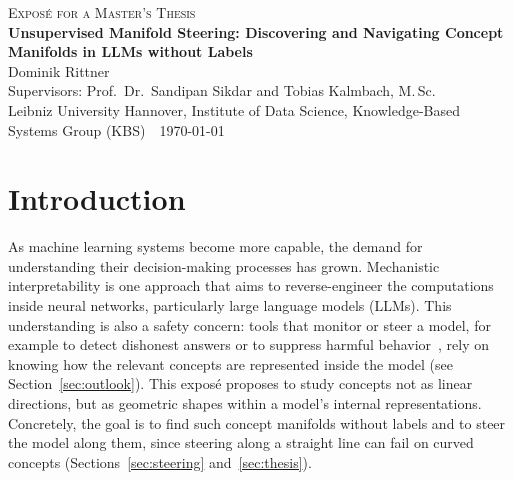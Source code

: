 \documentclass[11pt,a4paper]{article}
\newif\ifdraft
\newcommand{\fromextra}[1]{\textcolor{blue}{#1}}
\newcommand{\fromnotes}[1]{\textcolor{green!50!black}{#1}}
\newcommand{\fromold}[1]{\textcolor{violet}{#1}}
\newcommand{\fromclaude}[1]{\textcolor{orange!85!black}{#1}}
\newcommand{\fromextra}[1]{#1}
\newcommand{\fromnotes}[1]{#1}
\newcommand{\fromold}[1]{#1}
\newcommand{\fromclaude}[1]{#1}
\newcommand{\thesistitle}{Unsupervised Manifold Steering: Discovering and Navigating Concept Manifolds in LLMs without Labels}
\newcommand{\authorname}{Dominik Rittner}
\newcommand{\supervisor}{Prof.\ Dr.\ Sandipan Sikdar and Tobias Kalmbach, M.\,Sc.}
\newcommand{\university}{Leibniz University Hannover, Institute of Data Science, Knowledge-Based Systems Group (KBS)}
\begin{document}
\begin{center}
  {\small\scshape Exposé for a Master's Thesis}\\[0.4ex]
  {\Large\bfseries \thesistitle}\\[0.8ex]
  \authorname\\
  Supervisors: \supervisor\\
  \university\ \textbullet\ \today
\end{center}

\ifdraft
{\small\noindent\textit{Draft legend:} black = Structure.md reading notes;
\fromextra{blue = from the papers, not in the notes};
\fromnotes{green = other notes in the vault};
\fromold{purple = moved from old\_expose.tex};
\fromclaude{orange = added by Claude after your approval}.\par}
\fi




\section{Introduction}
As machine learning systems become more capable, the demand for understanding their decision-making processes has grown. Mechanistic interpretability is one approach that aims to reverse-engineer the computations inside neural networks, particularly large language models (LLMs).
This understanding is also a safety concern: tools that monitor or steer a model, for example to detect dishonest answers or to suppress harmful behavior~\cite{zou2023representation}, rely on knowing how the relevant concepts are represented inside the model \fromclaude{(see Section~\ref{sec:outlook})}.
This exposé proposes to study concepts not as linear directions, but as geometric shapes within a model's internal representations.
\fromclaude{Concretely, the goal is to find such concept manifolds without labels and to steer the model along them, since steering along a straight line can fail on curved concepts (Sections~\ref{sec:steering} and~\ref{sec:thesis}).}
\end{document}

